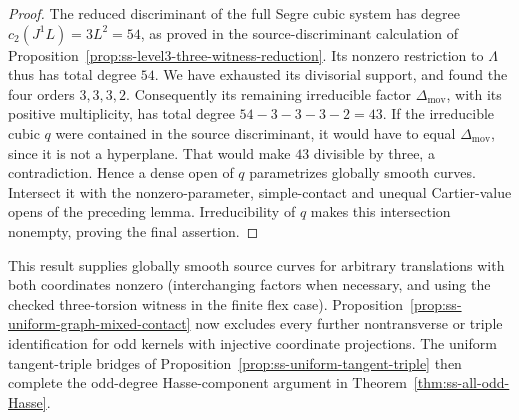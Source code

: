 \begin{proof}
The reduced discriminant of the full Segre cubic system has degree
$c_2(J^1L)=3L^2=54$, as proved in the source-discriminant calculation
of Proposition~\ref{prop:ss-level3-three-witness-reduction}.
Its nonzero restriction to $\Lambda$ thus has total degree $54$.
We have exhausted its divisorial support, and found the four orders
$3,3,3,2$. Consequently its remaining irreducible factor
$\Delta_{\mathrm{mov}}$, with its positive multiplicity, has total
degree $54-3-3-3-2=43$.
If the irreducible cubic $q$ were contained in the source discriminant,
it would have to equal $\Delta_{\mathrm{mov}}$, since it is not a
hyperplane. That would make $43$ divisible by three, a contradiction.
Hence a dense open of $q$ parametrizes globally smooth curves.
Intersect it with the nonzero-parameter, simple-contact and unequal
Cartier-value opens of the preceding lemma. Irreducibility of $q$
makes this intersection nonempty, proving the final assertion.
\end{proof}

\begin{remark}
This result supplies globally smooth source curves for arbitrary
translations with both coordinates nonzero (interchanging factors
when necessary, and using the checked three-torsion witness in the
finite flex case). Proposition~\ref{prop:ss-uniform-graph-mixed-contact}
now excludes every further nontransverse or triple identification
for odd kernels with injective coordinate projections. The uniform
tangent-triple bridges of Proposition~\ref{prop:ss-uniform-tangent-triple}
then complete the odd-degree Hasse-component argument in
Theorem~\ref{thm:ss-all-odd-Hasse}.
\end{remark}

